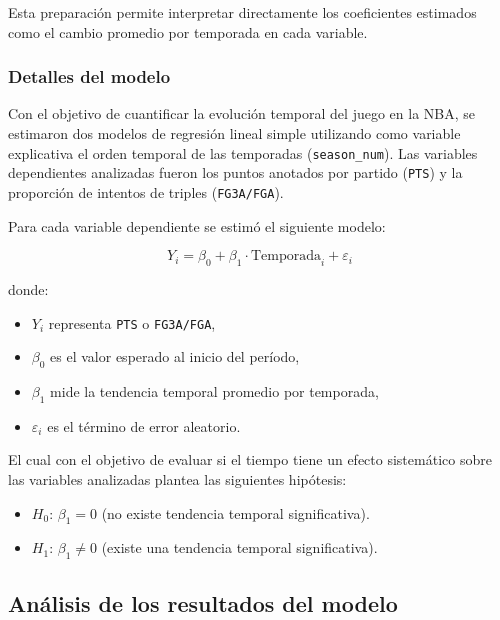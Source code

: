 \documentclass[12pt]{article}
\begin{document}
Esta preparación permite interpretar directamente los coeficientes estimados como el cambio promedio por temporada en cada variable.

\subsubsection{Detalles del modelo}

Con el objetivo de cuantificar la evolución temporal del juego en la NBA, se estimaron dos modelos de regresión lineal simple utilizando como variable explicativa el orden temporal de las temporadas (\texttt{season\_num}). Las variables dependientes analizadas fueron los puntos anotados por partido (\texttt{PTS}) y la proporción de intentos de triples (\texttt{FG3A/FGA}).

Para cada variable dependiente se estimó el siguiente modelo:

\[
Y_i = \beta_0 + \beta_1 \cdot \text{Temporada}_i + \varepsilon_i
\]

donde:
\begin{itemize}
    \item $Y_i$ representa \texttt{PTS} o \texttt{FG3A/FGA},
    \item $\beta_0$ es el valor esperado al inicio del período,
    \item $\beta_1$ mide la tendencia temporal promedio por temporada,
    \item $\varepsilon_i$ es el término de error aleatorio.
\end{itemize}

El cual con el objetivo de evaluar si el tiempo tiene un efecto sistemático sobre las variables analizadas
plantea las siguientes hipótesis:

\begin{itemize}
    \item $H_0$: $\beta_1 = 0$ (no existe tendencia temporal significativa).
    \item $H_1$: $\beta_1 \neq 0$ (existe una tendencia temporal significativa).
\end{itemize}

\subsection{Análisis de los resultados del modelo}
\label{subsec:pregunta2-resultados}




\end{document}
